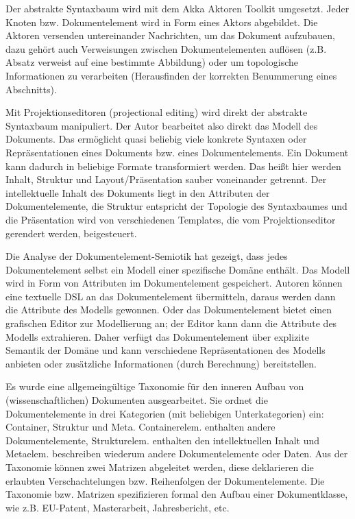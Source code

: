  
Der abstrakte Syntaxbaum wird mit dem Akka Aktoren Toolkit umgesetzt. Jeder Knoten bzw. Dokumentelement wird in Form eines Aktors abgebildet. Die Aktoren versenden untereinander Nachrichten, um das Dokument aufzubauen, dazu gehört auch Verweisungen zwischen Dokumentelementen auflösen (z.B. Absatz verweist auf eine bestimmte Abbildung) oder um topologische Informationen zu verarbeiten (Herausfinden der korrekten Benummerung eines Abschnitts).

 
Mit Projektionseditoren (projectional editing) wird direkt der abstrakte Syntaxbaum manipuliert. Der Autor bearbeitet also direkt das Modell des Dokuments. Das ermöglicht quasi beliebig viele konkrete Syntaxen oder Repräsentationen eines Dokuments bzw. eines Dokumentelements. Ein Dokument kann dadurch in beliebige Formate transformiert werden. Das heißt hier werden Inhalt, Struktur und Layout/Präsentation sauber voneinander getrennt. Der intellektuelle Inhalt des Dokuments liegt in den Attributen der Dokumentelemente, die Struktur entspricht der Topologie des Syntaxbaumes und die Präsentation wird von verschiedenen Templates, die vom Projektionseditor gerendert werden, beigesteuert.

 
Die Analyse der Dokumentelement-Semiotik hat gezeigt, dass jedes Dokumentelement selbst ein Modell einer spezifische Domäne enthält. Das Modell wird in Form von Attributen im Dokumentelement gespeichert. Autoren können eine textuelle DSL an das Dokumentelement übermitteln, daraus werden dann die Attribute des Modells gewonnen. Oder das Dokumentelement bietet einen grafischen Editor zur Modellierung an; der Editor kann dann die Attribute des Modells extrahieren. Daher verfügt das Dokumentelement über explizite Semantik der Domäne und kann verschiedene Repräsentationen des Modells anbieten oder zusätzliche Informationen (durch Berechnung) bereitstellen.

 
Es wurde eine allgemeingültige Taxonomie für den inneren Aufbau von (wissenschaftlichen) Dokumenten ausgearbeitet. Sie ordnet die Dokumentelemente in drei Kategorien (mit beliebigen Unterkategorien) ein: Container, Struktur und Meta. Containerelem. enthalten andere Dokumentelemente, Strukturelem. enthalten den intellektuellen Inhalt und Metaelem. beschreiben wiederum andere Dokumentelemente oder Daten. Aus der Taxonomie können zwei Matrizen abgeleitet werden, diese deklarieren die erlaubten Verschachtelungen bzw. Reihenfolgen der Dokumentelemente. Die Taxonomie bzw. Matrizen spezifizieren formal den Aufbau einer Dokumentklasse, wie z.B. EU-Patent, Masterarbeit, Jahresbericht, etc.

